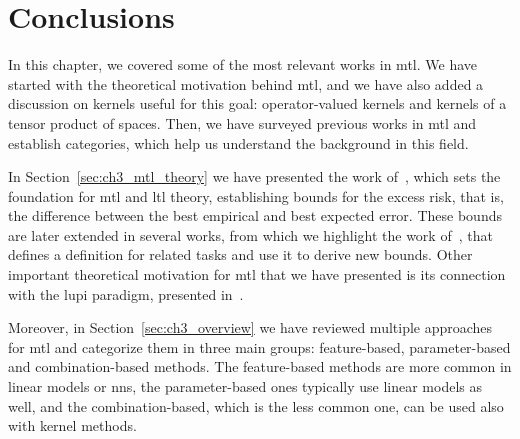 












\section{Conclusions}\label{sec:conclusions_ch3}

In this chapter, we covered some of the most relevant works in \acrshort{mtl}.
We have started with the theoretical motivation behind \acrshort{mtl}, and we have also added a discussion on kernels useful for this goal: operator-valued kernels and kernels of a tensor product of spaces. Then, we have surveyed previous works in \acrshort{mtl} and establish categories, which help us understand the background in this field.

%
In Section~\ref{sec:ch3_mtl_theory} we have presented the work of~\citep{baxter2000model}, which sets the foundation for \acrshort{mtl} and \acrshort{ltl} theory, establishing bounds for the excess risk, that is, the difference between the best empirical and best expected error. These bounds are later extended in several works, from which we highlight the work of~\citet{Ben-DavidS03}, that defines a definition for related tasks and use it to derive new bounds. Other important theoretical motivation for \acrshort{mtl} that we have presented is its connection with the \acrshort{lupi} paradigm, presented in~\citet{VapnikI15a}.
%

Moreover, in Section~\ref{sec:ch3_overview} we have reviewed multiple approaches for \acrshort{mtl} and categorize them in three main groups: feature-based, parameter-based and combination-based methods.
The feature-based methods are more common in linear models or \acrshort{nns}, the parameter-based ones typically use linear models as well, and the combination-based, which is the less common one, can be used also with kernel methods.

